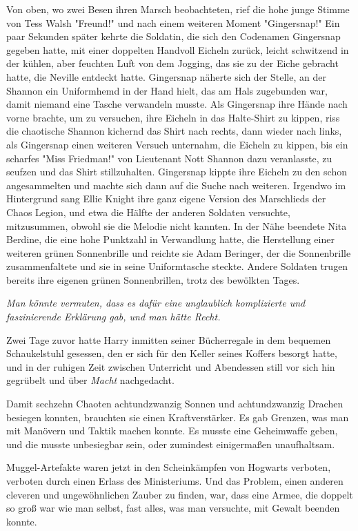 {Von oben, wo zwei Besen ihren Marsch beobachteten, rief die hohe junge Stimme von Tess Walsh "Freund!" und nach einem weiteren Moment "Gingersnap!" Ein paar Sekunden später kehrte die Soldatin, die sich den Codenamen Gingersnap gegeben hatte, mit einer doppelten Handvoll Eicheln zurück, leicht schwitzend in der kühlen, aber feuchten Luft von dem Jogging, das sie zu der Eiche gebracht hatte, die Neville entdeckt hatte. Gingersnap näherte sich der Stelle, an der Shannon ein Uniformhemd in der Hand hielt, das am Hals zugebunden war, damit niemand eine Tasche verwandeln musste. Als Gingersnap ihre Hände nach vorne brachte, um zu versuchen, ihre Eicheln in das Halte-Shirt zu kippen, riss die chaotische Shannon kichernd das Shirt nach rechts, dann wieder nach links, als Gingersnap einen weiteren Versuch unternahm, die Eicheln zu kippen, bis ein scharfes "Miss Friedman!" von Lieutenant Nott Shannon dazu veranlasste, zu seufzen und das Shirt stillzuhalten. Gingersnap kippte ihre Eicheln zu den schon angesammelten und machte sich dann auf die Suche nach weiteren. Irgendwo im Hintergrund sang Ellie Knight ihre ganz eigene Version des Marschlieds der Chaos Legion, und etwa die Hälfte der anderen Soldaten versuchte, mitzusummen, obwohl sie die Melodie nicht kannten. In der Nähe beendete Nita Berdine, die eine hohe Punktzahl in Verwandlung hatte, die Herstellung einer weiteren grünen Sonnenbrille und reichte sie Adam Beringer, der die Sonnenbrille zusammenfaltete und sie in seine Uniformtasche steckte. Andere Soldaten trugen bereits ihre eigenen grünen Sonnenbrillen, trotz des bewölkten Tages.

\emph{Man könnte vermuten, dass es dafür eine unglaublich komplizierte und faszinierende Erklärung gab, und man hätte Recht.}

Zwei Tage zuvor hatte Harry inmitten seiner Bücherregale in dem bequemen Schaukelstuhl gesessen, den er sich für den Keller seines Koffers besorgt hatte, und in der ruhigen Zeit zwischen Unterricht und Abendessen still vor sich hin gegrübelt und über \emph{Macht} nachgedacht.

Damit sechzehn Chaoten achtundzwanzig Sonnen und achtundzwanzig Drachen besiegen konnten, brauchten sie einen Kraftverstärker. Es gab Grenzen, was man mit Manövern und Taktik machen konnte. Es musste eine Geheimwaffe geben, und die musste unbesiegbar sein, oder zumindest einigermaßen unaufhaltsam.

Muggel-Artefakte waren jetzt in den Scheinkämpfen von Hogwarts verboten, verboten durch einen Erlass des Ministeriums. Und das Problem, einen anderen cleveren und ungewöhnlichen Zauber zu finden, war, dass eine Armee, die doppelt so groß war wie man selbst, fast alles, was man versuchte, mit Gewalt beenden konnte.

}
